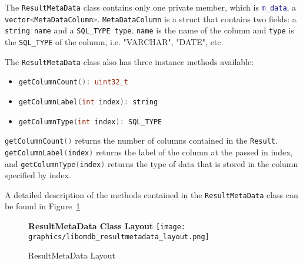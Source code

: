 \documentclass[letterpaper, 12pt]{article}
\newcommand{\inlinecode}[1]{\colorbox{codegrey}{\lstinline[language=C++]{#1}}}
\begin{document}
  The \inlinecode{ResultMetaData} class contains only one
  private member, which is
  \inlinecode{m_data}, a
  \inlinecode{vector<MetaDataColumn>}.
  \inlinecode{MetaDataColumn} is a struct that contains two fields:
  a \inlinecode{string name} and a
  \inlinecode{SQL_TYPE type}. \inlinecode{name}
  is the name of the column and \inlinecode{type} is the
  \inlinecode{SQL_TYPE} of the column, i.e. "VARCHAR", "DATE", etc.
  \par\vspace{\baselineskip}
  The \inlinecode{ResultMetaData} class also has
  three instance methods available:
  \begin{itemize}
    \item \inlinecode{getColumnCount(): uint32_t}
    \item \inlinecode{getColumnLabel(int index): string}
    \item \inlinecode{getColumnType(int index): SQL_TYPE}
  \end{itemize}

  \inlinecode{getColumnCount()} returns the number of
  columns contained in the \inlinecode{Result}.
  \inlinecode{getColumnLabel(index)} returns the label of the
  column at the passed in index, and
  \inlinecode{getColumnType(index)} returns the type of data that
  is stored in the column specified by index.
  \par\vspace{\baselineskip}
  A detailed description of the methods contained in the \inlinecode{ResultMetaData}
  class can be found in Figure~\ref{fig:reultmetadata_methods}
  \begin{figure}
    \label{fig:reultmetadata_methods}
    \centering
    \textbf{ResultMetaData Class Layout}
    \texttt{[image: graphics/libomdb\_resultmetadata\_layout.png]}
    \caption{ResultMetaData Layout}
  \end{figure}

  \newpage
\end{document}
